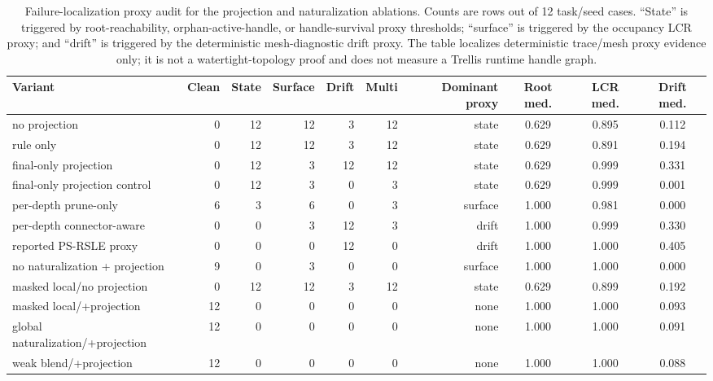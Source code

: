 \begin{table}[t]
\centering
\small
\setlength{\tabcolsep}{3.5pt}
\caption{Failure-localization proxy audit for the projection and naturalization ablations. Counts are rows out of 12 task/seed cases. ``State'' is triggered by root-reachability, orphan-active-handle, or handle-survival proxy thresholds; ``surface'' is triggered by the occupancy LCR proxy; and ``drift'' is triggered by the deterministic mesh-diagnostic drift proxy. The table localizes deterministic trace/mesh proxy evidence only; it is not a watertight-topology proof and does not measure a Trellis runtime handle graph.}
\label{tab:failure-localization-proxy-audit-20260513}
\begin{tabular}{lrrrrrrccc}
\toprule
Variant & Clean & State & Surface & Drift & Multi & Dominant proxy & Root med. & LCR med. & Drift med. \\
\midrule
no projection & 0 & 12 & 12 & 3 & 12 & state & 0.629 & 0.895 & 0.112 \\
rule only & 0 & 12 & 12 & 3 & 12 & state & 0.629 & 0.891 & 0.194 \\
final-only projection & 0 & 12 & 3 & 12 & 12 & state & 0.629 & 0.999 & 0.331 \\
final-only projection control & 0 & 12 & 3 & 0 & 3 & state & 0.629 & 0.999 & 0.001 \\
per-depth prune-only & 6 & 3 & 6 & 0 & 3 & surface & 1.000 & 0.981 & 0.000 \\
per-depth connector-aware & 0 & 0 & 3 & 12 & 3 & drift & 1.000 & 0.999 & 0.330 \\
reported PS-RSLE proxy & 0 & 0 & 0 & 12 & 0 & drift & 1.000 & 1.000 & 0.405 \\
no naturalization + projection & 9 & 0 & 3 & 0 & 0 & surface & 1.000 & 1.000 & 0.000 \\
masked local/no projection & 0 & 12 & 12 & 3 & 12 & state & 0.629 & 0.899 & 0.192 \\
masked local/+projection & 12 & 0 & 0 & 0 & 0 & none & 1.000 & 1.000 & 0.093 \\
global naturalization/+projection & 12 & 0 & 0 & 0 & 0 & none & 1.000 & 1.000 & 0.091 \\
weak blend/+projection & 12 & 0 & 0 & 0 & 0 & none & 1.000 & 1.000 & 0.088 \\
\bottomrule
\end{tabular}
\end{table}
